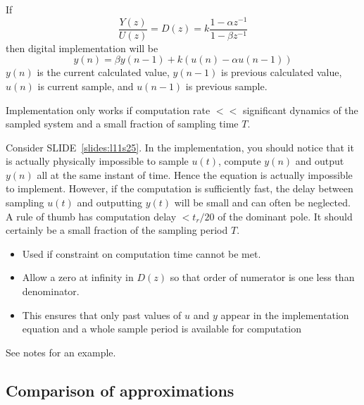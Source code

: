 \begin{slide}\label{slides:l11s25}
	If $$\frac{Y(z)}{U(z)}=D(z)=k\frac{1-\alpha z^{-1}}{1-\beta z^{-1}}$$ then digital implementation will be
	$$y(n)=\beta y(n-1)+k(u(n)-\alpha u(n-1))$$
	$y(n)$ is the current calculated value, $y(n-1)$ is previous calculated value, $u(n)$ is current sample, and $u(n-1)$ is previous sample.
	
	Implementation only works if computation rate $<<$ significant dynamics of the sampled system and a small fraction of sampling time $T$.
\end{slide}

Consider SLIDE~\ref{slides:l11s25}. In the implementation, you should notice that it is actually physically impossible to sample $u(t)$, compute $y(n)$ and output $y(n)$ all at the same instant of time. Hence the equation is actually impossible to implement. However, if the computation is sufficiently fast, the delay between sampling $u(t)$ and outputting $y(t)$ will be small and can often be neglected.  A rule of thumb has computation delay $< t_r/20$ of the dominant pole. It should certainly be a small fraction of the sampling period $T$. 

\begin{slide}\label{slides:l11s26}
	\begin{itemize}
	\item
	Used if constraint on computation time cannot be met.
	
	\item Allow a zero at infinity in $D(z)$ so that order of numerator is one less than denominator.
	
	\item This ensures that only past values of $u$ and $y$ appear in the implementation equation and a whole sample period is available for computation
	
\end{itemize}
See notes for an example.
\end{slide}

 \subsection*{Comparison of approximations}


\endinput

